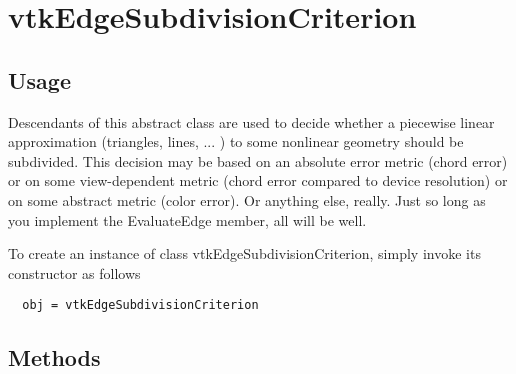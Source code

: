 \section{vtkEdgeSubdivisionCriterion}

\subsection{Usage}

 Descendants of this abstract class are used to decide whether a
 piecewise linear approximation (triangles, lines, ... ) to some
 nonlinear geometry should be subdivided. This decision may be
 based on an absolute error metric (chord error) or on some
 view-dependent metric (chord error compared to device resolution)
 or on some abstract metric (color error). Or anything else, really.
 Just so long as you implement the EvaluateEdge member, all will
 be well.


To create an instance of class vtkEdgeSubdivisionCriterion, simply
invoke its constructor as follows
\begin{verbatim}
  obj = vtkEdgeSubdivisionCriterion
\end{verbatim}
\subsection{Methods}

